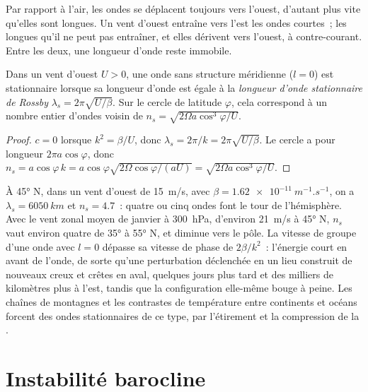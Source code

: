 Par rapport à l'air, les ondes se déplacent toujours vers l'ouest, d'autant plus
vite qu'elles sont longues. Un vent d'ouest entraîne vers l'est les ondes courtes~; les longues
qu'il ne peut pas entraîner, et elles dérivent vers l'ouest, à contre-courant. Entre les deux,
une longueur d'onde reste immobile.

\begin{proposition}\label{prop:b3:atmospheric-dynamics:stationary}
Dans un vent d'ouest $U > 0$, une onde sans structure méridienne ($l = 0$) est
stationnaire lorsque sa longueur d'onde est égale à la \emph{longueur d'onde stationnaire
de Rossby} $\lambda_s =
2\pi\sqrt{U/\beta}$. Sur le cercle de latitude $\varphi$, cela correspond à un
nombre entier d'ondes voisin de $n_s = \sqrt{2\Omega a\cos^3\varphi/U}$.
\end{proposition}

\begin{proof}
$c = 0$ lorsque $k^2 = \beta/U$, donc $\lambda_s = 2\pi/k = 2\pi\sqrt{U/\beta}$.
Le cercle a pour longueur $2\pi a\cos\varphi$, donc $n_s = a\cos\varphi\,k =
a\cos\varphi\sqrt{2\Omega\cos\varphi/(aU)} = \sqrt{2\Omega a\cos^3\varphi/U}$.
\end{proof}

À \ang{45} N, dans un vent d'ouest de \qty{15}{m/s}, avec $\beta =
\qty{1.62e-11}{m^{-1}.s^{-1}}$, on a $\lambda_s = \qty{6050}{km}$ et $n_s =
4.7$~: quatre ou cinq ondes font le tour de l'hémisphère. Avec le vent zonal moyen
de janvier à \qty{300}{hPa}, d'environ \qty{21}{m/s} à \ang{45} N, $n_s$
vaut environ quatre de \ang{35} à \ang{55} N, et diminue vers le pôle. La vitesse
de groupe d'une onde avec $l = 0$ dépasse sa vitesse de phase de $2\beta/k^2$~:
l'énergie court en avant de l'onde, de sorte qu'une perturbation déclenchée en
un lieu construit de nouveaux creux et crêtes en aval, quelques jours plus tard
et des milliers de kilomètres plus à l'est, tandis que la configuration elle-même
bouge à peine. Les chaînes de montagnes et les contrastes de température entre
continents et océans forcent des ondes stationnaires de ce type, par l'étirement
et la compression de la .


\section{Instabilité barocline}\label{sec:b3:atmospheric-dynamics:baroclinic}

